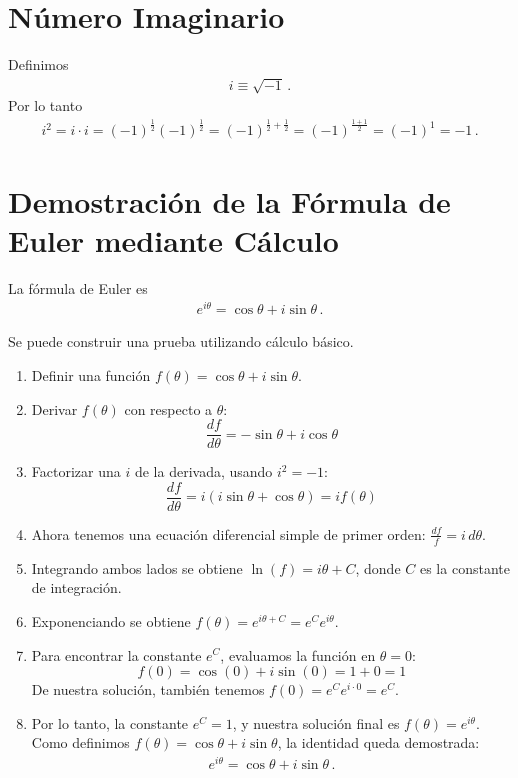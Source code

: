 \documentclass[11pt,a4paper]{article}
\begin{document}
\section{Número Imaginario}
Definimos
\begin{align}
    i \equiv \sqrt{-1}\,.
\end{align}
Por lo tanto
\begin{align}
    i^2 = i\cdot i = (-1)^{\frac{1}{2}}(-1)^{\frac{1}{2}}=(-1)^{\frac{1}{2}+\frac{1}{2}}
    =(-1)^{\frac{1+1}{2}}= (-1)^1 = -1\,.
\end{align}
\section{Demostración de la Fórmula de Euler mediante Cálculo}
La fórmula de Euler es
    \begin{align*}
        e^{i\theta} = \cos\theta + i\sin\theta\,.
    \end{align*}

Se puede construir una prueba utilizando cálculo básico.
\begin{enumerate}
    \item Definir una función $f(\theta) = \cos\theta + i\sin\theta$.
    \item Derivar $f(\theta)$ con respecto a $\theta$:
    \[ \frac{df}{d\theta} = -\sin\theta + i\cos\theta \]
    \item Factorizar una $i$ de la derivada, usando $i^2=-1$:
    \[ \frac{df}{d\theta} = i(i\sin\theta + \cos\theta) = i f(\theta) \]
    \item Ahora tenemos una ecuación diferencial simple de primer orden: $\frac{df}{f} = i \, d\theta$.
    \item Integrando ambos lados se obtiene $\ln(f) = i\theta + C$, donde $C$ es la constante de integración.
    \item Exponenciando se obtiene $f(\theta) = e^{i\theta+C} = e^C e^{i\theta}$.
    \item Para encontrar la constante $e^C$, evaluamos la función en $\theta=0$:
    \[ f(0) = \cos(0) + i\sin(0) = 1 + 0 = 1 \]
    De nuestra solución, también tenemos $f(0) = e^C e^{i \cdot 0} = e^C$.
    \item Por lo tanto, la constante $e^C=1$, y nuestra solución final es $f(\theta) = e^{i\theta}$. Como definimos $f(\theta) = \cos\theta + i\sin\theta$, la identidad queda demostrada:
    \begin{align}
    \boxed{
        e^{i\theta} = \cos\theta + i\sin\theta\,.
        }
    \end{align}
\end{enumerate}
\end{document}
